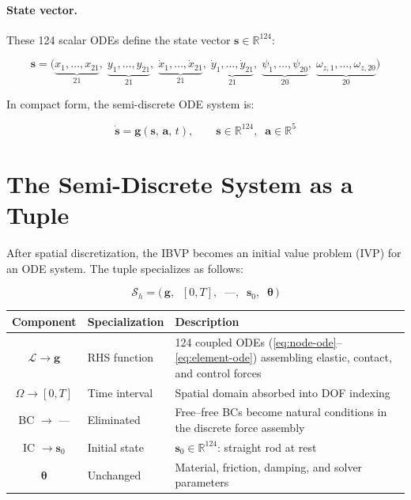 \documentclass[11pt]{article}
\newcommand{\vect}[1]{\mathbf{#1}}
\newcommand{\Real}{\mathbb{R}}
\begin{document}
\paragraph{State vector.}
These 124 scalar ODEs define the state vector $\vect{s} \in \Real^{124}$:

\begin{equation}
  \vect{s} = \bigl(\underbrace{x_1, \ldots, x_{21}}_{21},\;
               \underbrace{y_1, \ldots, y_{21}}_{21},\;
               \underbrace{\dot{x}_1, \ldots, \dot{x}_{21}}_{21},\;
               \underbrace{\dot{y}_1, \ldots, \dot{y}_{21}}_{21},\;
               \underbrace{\psi_1, \ldots, \psi_{20}}_{20},\;
               \underbrace{\omega_{z,1}, \ldots, \omega_{z,20}}_{20}\bigr)
  \label{eq:state-vector}
\end{equation}

In compact form, the semi-discrete ODE system is:

\begin{equation}
  \boxed{\;\dot{\vect{s}} = \vect{g}(\vect{s},\, \vect{a},\, t), \qquad
  \vect{s} \in \Real^{124},\;\; \vect{a} \in \Real^{5}\;}
  \label{eq:ode-compact}
\end{equation}

\section{The Semi-Discrete System as a Tuple}
\label{sec:ode-tuple}

After spatial discretization, the IBVP becomes an initial value problem (IVP) for an ODE system.
The tuple specializes as follows:

\begin{equation}
  \boxed{\;\mathcal{S}_h = \bigl(\,\vect{g},\;\; [0, T],\;\; \text{---},\;\; \vect{s}_0,\;\; \bm{\theta}\,\bigr)\;}
  \label{eq:ode-tuple}
\end{equation}

\begin{table}[H]
  \centering
  \begin{tabular}{clp{8cm}}
    \toprule
    Component & Specialization & Description \\
    \midrule
    $\mathcal{L} \to \vect{g}$ & RHS function & 124 coupled ODEs (\ref{eq:node-ode}--\ref{eq:element-ode}) assembling elastic, contact, and control forces \\[4pt]
    $\Omega \to [0, T]$ & Time interval & Spatial domain absorbed into DOF indexing \\[4pt]
    BC $\to$ --- & Eliminated & Free--free BCs become natural conditions in the discrete force assembly \\[4pt]
    IC $\to \vect{s}_0$ & Initial state & $\vect{s}_0 \in \Real^{124}$: straight rod at rest \\[4pt]
    $\bm{\theta}$ & Unchanged & Material, friction, damping, and solver parameters \\
    \bottomrule
  \end{tabular}
\end{table}
\end{document}
